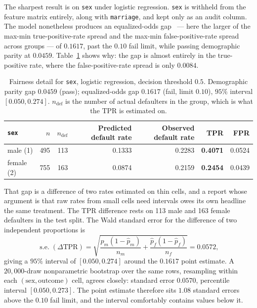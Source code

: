\documentclass[10pt,a4paper]{article}
\newcommand{\code}[1]{\texttt{\small #1}}
\begin{document}
The sharpest result is on \code{sex} under logistic regression. \code{sex} is
withheld from the feature matrix entirely, along with \code{marriage}, and kept
only as an audit column. The model nonetheless produces an equalized-odds
gap~\cite{hardt2016} --- here the larger of the max-min true-positive-rate spread
and the max-min false-positive-rate spread across groups --- of $\mathbf{0.1617}$,
past the $0.10$ fail limit, while passing demographic parity at $0.0459$.
Table~\ref{tab:sex} shows why: the gap is almost entirely in the true-positive
rate, where the false-positive-rate spread is only $0.0084$.

\begin{table}[htbp]
\centering
\small
\caption{Fairness detail for \code{sex}, logistic regression, decision threshold
$0.5$. Demographic parity gap $0.0459$ (pass); equalized-odds gap
$\mathbf{0.1617}$ (fail, limit $0.10$), $95\%$ interval $[0.050, 0.274]$.
$n_{\mathrm{def}}$ is the number of actual defaulters in the group, which is what
the TPR is estimated on.}
\label{tab:sex}
\begin{tabular}{lrrrrrr}
\toprule
\code{sex} & $n$ & $n_{\mathrm{def}}$ & Predicted default rate & Observed default rate & TPR & FPR \\
\midrule
male (1)   & 495 & 113 & 0.1333 & 0.2283 & \textbf{0.4071} & 0.0524 \\
female (2) & 755 & 163 & 0.0874 & 0.2159 & \textbf{0.2454} & 0.0439 \\
\bottomrule
\end{tabular}
\end{table}

That gap is a difference of two rates estimated on thin cells, and a report whose
argument is that raw rates from small cells need intervals owes its own headline
the same treatment. The TPR difference rests on 113 male and 163 female defaulters
in the test split. The Wald standard error for the difference of two independent
proportions is
%
\begin{equation}
\operatorname{s.e.}(\Delta\mathrm{TPR}) =
  \sqrt{\frac{\hat p_m(1-\hat p_m)}{n_m} + \frac{\hat p_f(1-\hat p_f)}{n_f}}
  = 0.0572,
\label{eq:tprse}
\end{equation}
%
giving a $95\%$ interval of $[0.050, 0.274]$ around the $0.1617$ point estimate. A
$20{,}000$-draw nonparametric bootstrap over the same rows, resampling within each
$(\text{sex}, \text{outcome})$ cell, agrees closely: standard error $0.0570$,
percentile interval $[0.050, 0.273]$. The point estimate therefore sits $1.08$
standard errors above the $0.10$ fail limit, and the interval comfortably contains
values below it.
\end{document}
